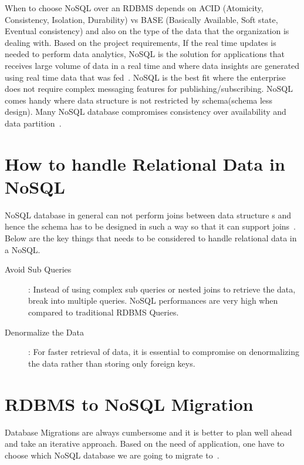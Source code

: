 When to choose NoSQL over an RDBMS depends on ACID 
(Atomicity, Consistency, Isolation, Durability) vs BASE 
(Basically Available, Soft state, Eventual consistency) and also on the
type of the data that the organization is dealing with. Based on the 
project requirements, If the real time updates is needed to perform 
data analytics, NoSQL is the solution for applications that receives
large volume of data in a real time and where data insights are 
generated using real time data that was fed~\cite{hid-sp18-710-datastax}. 
NoSQL is the best fit where the enterprise does not require complex 
messaging features for publishing/subscribing. NoSQL comes handy where
data structure is not restricted by schema(schema less design). Many 
NoSQL database compromises consistency over availability and data 
partition~\cite{hid-sp18-710-volt}.

\section{How to handle Relational Data in NoSQL}

NoSQL database in general can not perform joins between data structure
s and hence the schema has to be designed in such a way so that it 
can support joins~\cite{hid-sp18-710-vish}. Below are the key things that needs
to be considered to handle relational data in a NoSQL.

\begin{description}
    \item[Avoid Sub Queries]: Instead of using complex sub queries 
    or nested joins to retrieve the data, break into multiple 
    queries. NoSQL performances are very high when compared to 
    traditional RDBMS Queries.
    \item[Denormalize the Data]: For faster retrieval of data, 
    it is essential to compromise on denormalizing the data rather
    than storing only foreign keys.
    
\end{description}

\section{RDBMS to NoSQL Migration}

Database Migrations are always cumbersome and it is better to
plan well ahead and take an iterative approach. Based on the 
need of application, one have to choose which NoSQL database
we are going to migrate to~\cite{hid-sp18-710-aws}.

